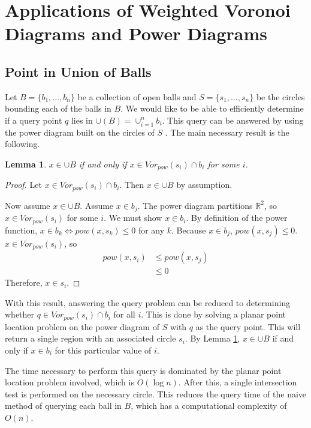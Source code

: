 \documentclass[a4paper, 11pt]{article}
\newtheorem{lemma}{Lemma}[section]
\newcommand{\R}{\mathbb{R}}
\begin{document}
\section{Applications of Weighted Voronoi Diagrams and Power Diagrams}

\subsection{Point in Union of Balls}

Let $B = \{b_1,\dots, b_n\}$ be a collection of open balls and $S = \{s_1, \dots, s_n\}$ be the circles bounding each of the balls in $B$. We would
like to be able to efficiently determine if a query point $q$ lies in $\cup(B) = \cup_{i=1}^n b_i$. This query can be answered by using the power diagram
built on the circles of $S$ \cite{aurenhammer_discs}. The main necessary result is the following.

\begin{lemma}
  \label{lem:pow_query}
  $x \in \cup B$ if and only if $x \in Vor_{pow}(s_i) \cap b_i$ for some $i$.
\end{lemma}
\begin{proof}
  Let $x \in Vor_{pow}(s_i) \cap b_i$. Then $x \in \cup B$ by assumption.

  Now assume $x \in \cup B$. Assume $x \in b_j$. The power diagram partitions $\R^2$, so $x \in Vor_{pow}(s_i)$ for some $i$. We must show $x \in
  b_i$. By definition of the power function, $x \in b_k \Leftrightarrow pow(x,s_k) \leq 0$ for any $k$. Because $x \in b_j$, $pow(x,s_j) \leq 0$. $x
  \in Vor_{pow}(s_i)$, so
  \begin{align*}
    pow(x,s_i) &\leq pow(x, s_j) \\
    &\leq 0
  \end{align*}
  Therefore, $x \in s_i$.
\end{proof}

With this result, answering the query problem can be reduced to determining whether $q \in Vor_{pow}(s_i) \cap b_i$ for all $i$. This is done by
solving a planar point location problem on the power diagram of $S$ with $q$ as the query point. This will return a single region with an associated
circle $s_i$. By Lemma \ref{lem:pow_query}, $x \in \cup B$ if and only if $x \in b_i$ for this particular value of $i$.

The time necessary to perform this query is dominated by the planar point location problem involved, which is $O(\log n)$. After this, a single
intersection test is performed on the necessary circle. This reduces the query time of the naive method of querying each ball in $B$, which has a
computational complexity of $O(n)$.
\end{document}
